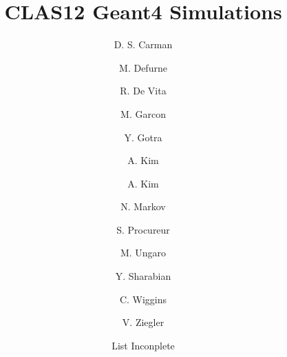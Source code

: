 \title{CLAS12 Geant4 Simulations}




\author[A]{D. S. Carman}
\author[C]{M. Defurne}
\author[B]{R. De Vita}
\author[C]{M. Garcon}
\author[A]{Y. Gotra}
\author[D]{A. Kim}
\author[D]{A. Kim}
\author[C]{N. Markov}
\author[C]{S. Procureur}
\author[A]{M. Ungaro}
\author[A]{Y. Sharabian}
\author[A]{C. Wiggins}
\author[A]{V. Ziegler}
\author[A]{List Inconplete}

\address[A]{Thomas Jefferson National Accelerator Facility, Newport News, VA, USA}
\address[B]{Istituto Nazionale Di Fisica Nucleare, Genova, Italy}
\address[C]{IRFU, CEA, Universit\`e Paris-Saclay, F-91191 Gif-sur-Yvette, France}
\address[D]{University of Connecticut, Storrs, Connecticut}
